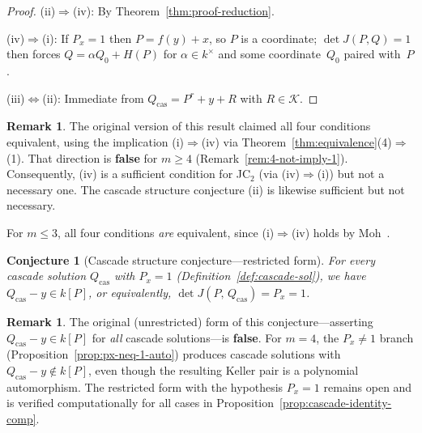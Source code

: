 \documentclass[12pt,a4paper]{article}
\newtheorem{conjecture}[theorem]{Conjecture}
\theoremstyle{definition}
\newtheorem{remark}[theorem]{Remark}
\newcommand{\kk}{k}
\begin{document}
\begin{proof}
(ii)$\Rightarrow$(iv): By Theorem~\ref{thm:proof-reduction}.

(iv)$\Rightarrow$(i): If $P_x = 1$ then $P = f(y) + x$, so $P$ is a
coordinate; $\det J(P,Q) = 1$ then forces $Q = \alpha Q_0 + H(P)$ for
$\alpha \in \kk^\times$ and some coordinate~$Q_0$ paired with~$P$.

(iii)$\Leftrightarrow$(ii): Immediate from $Q_{\mathrm{cas}} = P^r + y + R$
with $R \in \mathcal{K}$.
\end{proof}

\begin{remark}
The original version of this result claimed all four conditions
equivalent, using the implication (i)$\Rightarrow$(iv) via
Theorem~\ref{thm:equivalence}(4)$\Rightarrow$(1). That direction
is \textbf{false} for $m \geq 4$ (Remark~\ref{rem:4-not-imply-1}).
Consequently, (iv) is a sufficient condition for JC$_2$ (via
(iv)$\Rightarrow$(i)) but not a necessary one. The cascade structure
conjecture (ii) is likewise sufficient but not necessary.

For $m \leq 3$, all four conditions \emph{are} equivalent,
since (i)$\Rightarrow$(iv) holds by Moh~\cite{Moh}.
\end{remark}

\begin{conjecture}[Cascade structure conjecture---restricted form]%
\label{conj:cascade-structure}
For every cascade solution $Q_{\mathrm{cas}}$ with $P_x = 1$
(Definition~\ref{def:cascade-sol}), we have
$Q_{\mathrm{cas}} - y \in \kk[P]$,
or equivalently,
$\det J(P,\, Q_{\mathrm{cas}}) = P_x = 1$.
\end{conjecture}

\begin{remark}
The original (unrestricted) form of this conjecture---asserting
$Q_{\mathrm{cas}} - y \in \kk[P]$ for \emph{all} cascade solutions---is
\textbf{false}. For $m = 4$, the $P_x \neq 1$ branch
(Proposition~\ref{prop:px-neq-1-auto}) produces cascade solutions with
$Q_{\mathrm{cas}} - y \notin \kk[P]$, even though the resulting Keller
pair is a polynomial automorphism. The restricted form with the hypothesis
$P_x = 1$ remains open and is verified computationally for all cases in
Proposition~\ref{prop:cascade-identity-comp}.
\end{remark}
\end{document}
